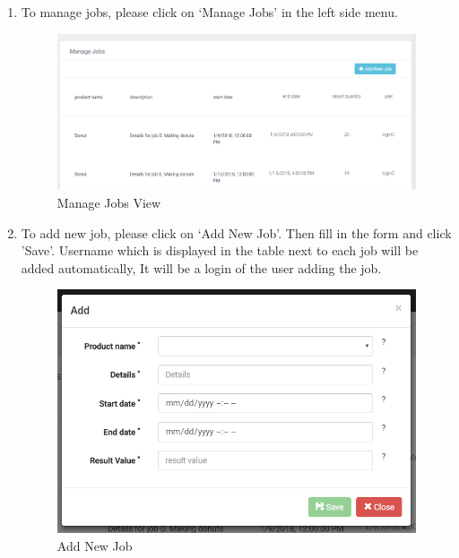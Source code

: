 \documentclass[a4paper,11pt,twoside]{report}
\theoremstyle{definition}
\begin{document}
\begin{enumerate}
\item To manage jobs, please click on ‘Manage Jobs’ in the left side menu. 

\begin{figure}[h!]
\begin{center}
\includegraphics[width=\textwidth]{AS/jobs/1}
\end{center}
\caption{Manage Jobs View}
\end{figure}



\item To add new job, please click on ‘Add New Job’. Then fill in the form and click 'Save'. Username which is displayed in the table next to each job will be added automatically, It will be a login of the user adding the job.
\begin{figure}[h!]
\begin{center}
\includegraphics[width=\textwidth]{AS/jobs/2}
\end{center}
\caption{Add New Job}
\end{figure}
\thispagestyle{empty}


\end{enumerate} 
\end{document}

